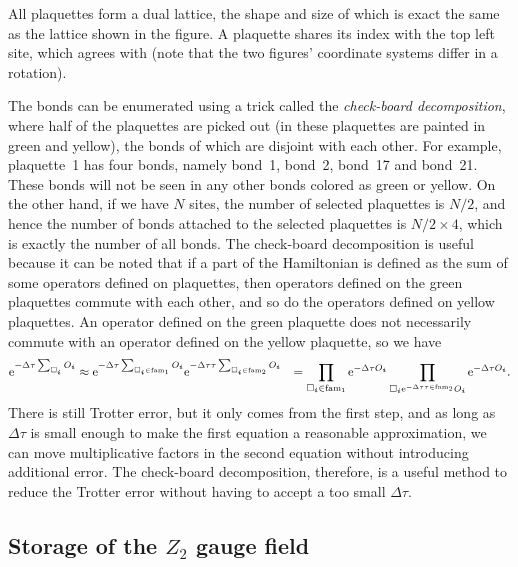 \documentclass[hyperref, a4paper]{article}
\newcommand*{\ee}{\mathrm{e}}
\newcommand*{\Ztwo}{$\mathbb{Z}_2$ }
\def\\{}%
\def\mathbb#1{#1}%
\begin{document}
All plaquettes form a dual lattice, the shape and size of which is exact the same as the lattice shown in the figure.
A plaquette shares its index with the top left site, 
which agrees with  (note that the two figures' coordinate systems differ in a rotation).

The bonds can be enumerated using a trick called the \emph{check-board decomposition}, 
where half of the plaquettes are picked out
(in  these plaquettes are painted in green and yellow), 
the bonds of which are disjoint with each other.
For example, plaquette~1 has four bonds, namely bond~1, bond~2, bond~17 and bond~21.
These bonds will not be seen in any other bonds colored as green or yellow.
On the other hand, if we have $N$ sites, the number of selected plaquettes is $N/2$, 
and hence the number of bonds attached to the selected plaquettes is $N/2 \times 4$, which is exactly the number of all bonds.
The check-board decomposition is useful because it can be noted that if a part of the Hamiltonian is defined as the sum of some operators defined on plaquettes, 
then operators defined on the green plaquettes commute with each other, and so do the operators defined on yellow plaquettes.
An operator defined on the green plaquette does not necessarily commute with an operator defined on the yellow plaquette,
so we have 
\begin{equation}
    \begin{aligned}
        \ee^{-\Delta \tau \sum_{\Box_{\vb*{i}}} O_{\vb*{i}}} &\approx \ee^{- \Delta \tau \sum_{\Box_{\vb*{i}} \in \mathrm{fam}_1} O_{\vb*{i}}} \ee^{- \Delta \tau \tau \sum_{\Box_{\vb*{i}} \in \mathrm{fam}_2} O_{\vb*{i}}}  \\
        &= \prod_{\Box_{\vb*{i}} \in \mathrm{fam}_1} \ee^{- \Delta \tau O_{\vb*{i}}} \prod_{\Box_{\vb*{i}} \ee^{- \Delta \tau \tau \in \mathrm{fam}_2} O_{\vb*{i}}} \ee^{- \Delta \tau O_{\vb*{i}}}.
    \end{aligned}
\end{equation}
There is still Trotter error, but it only comes from the first step, and as long as $\Delta \tau$ is small enough to make the first equation a reasonable approximation, we can move multiplicative factors in the second equation without introducing additional error.
The check-board decomposition, therefore, is a useful method to reduce the Trotter error without having to accept a too small $\Delta \tau$.

\subsection{Storage of the \Ztwo gauge field}
\end{document}

